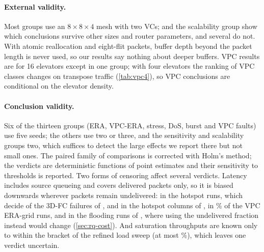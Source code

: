 \paragraph{External validity.} Most groups use an $8\times8\times4$ mesh with two VCs;  and the scalability group show which conclusions survive other sizes and router parameters, and several do not. With atomic reallocation and eight-flit packets, buffer depth beyond the packet length is never used, so our results say nothing about deeper buffers. VPC results are for 16 elevators except in one group; with four elevators the ranking of VPC classes changes on transpose traffic (\cref{tab:vpc4}), so VPC conclusions are conditional on the elevator density.

\paragraph{Conclusion validity.} Six of the thirteen groups (ERA, VPC-ERA, stress, DoS, burst and VPC faults) use five seeds; the others use two or three, and the sensitivity and scalability groups two, which suffices to detect the large effects we report there but not small ones. The paired family of comparisons is corrected with Holm's method; the verdicts are deterministic functions of point estimates and their sensitivity to thresholds is reported. Two forms of censoring affect several verdicts. Latency includes source queueing and covers delivered packets only, so it is biased downwards wherever packets remain undelivered: in the hotspot runs, which decide  of the  3D-FC failures of , and in the hotspot columns of , in \% of the VPC ERA-grid runs, and in the flooding runs of , where using the undelivered fraction instead would change  (\cref{sec:rq-cost}). And saturation throughputs are known only to within the bracket of the refined load sweep (at most \%), which leaves one  verdict uncertain.

